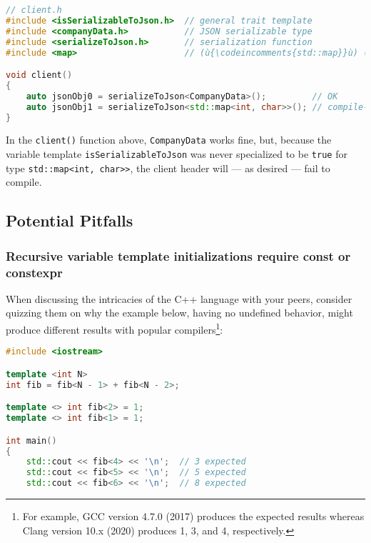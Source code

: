 {\begin{lstlisting}[language=C++]
// client.h
#include <isSerializableToJson.h>  // general trait template
#include <companyData.h>           // JSON serializable type
#include <serializeToJson.h>       // serialization function
#include <map>                     // (ù{\codeincomments{std::map}}ù) (not JSON serializable)

void client()
{
    auto jsonObj0 = serializeToJson<CompanyData>();         // OK
    auto jsonObj1 = serializeToJson<std::map<int, char>>(); // compile-time error
}
\end{lstlisting}
    
\noindent In the \texttt{client()} function above, \texttt{CompanyData} works
fine, but, because the variable template \texttt{isSerializableToJson}
was never specialized to be \texttt{true} for type
\mbox{\texttt{std::map<int,} \texttt{char>>}}, the client header will --- as
desired --- fail to compile.

\subsection[Potential Pitfalls]{Potential Pitfalls}\label{variabletemplate-potential-pitfalls}

\subsubsection[Recursive variable template initializations require {\tt const} or {\tt constexpr}]{Recursive variable template initializations require {\SubsubsecCode const} or {\SubsubsecCode constexpr}}\label{recursive-variable-template-initializations-require-const-or-constexpr}

When discussing the intricacies of the C++ language with your peers, consider quizzing them on why the
example below, having no undefined behavior, might produce different results with popular compilers{\cprotect\footnote{For
example, GCC version 4.7.0 (2017) produces the expected results whereas
  Clang version 10.x (2020) produces 1, 3, and 4, respectively.}}:

\begin{lstlisting}[language=C++]
#include <iostream>

template <int N>
int fib = fib<N - 1> + fib<N - 2>;

template <> int fib<2> = 1;
template <> int fib<1> = 1;

int main()
{
    std::cout << fib<4> << '\n';  // 3 expected
    std::cout << fib<5> << '\n';  // 5 expected
    std::cout << fib<6> << '\n';  // 8 expected


\end{lstlisting}}
